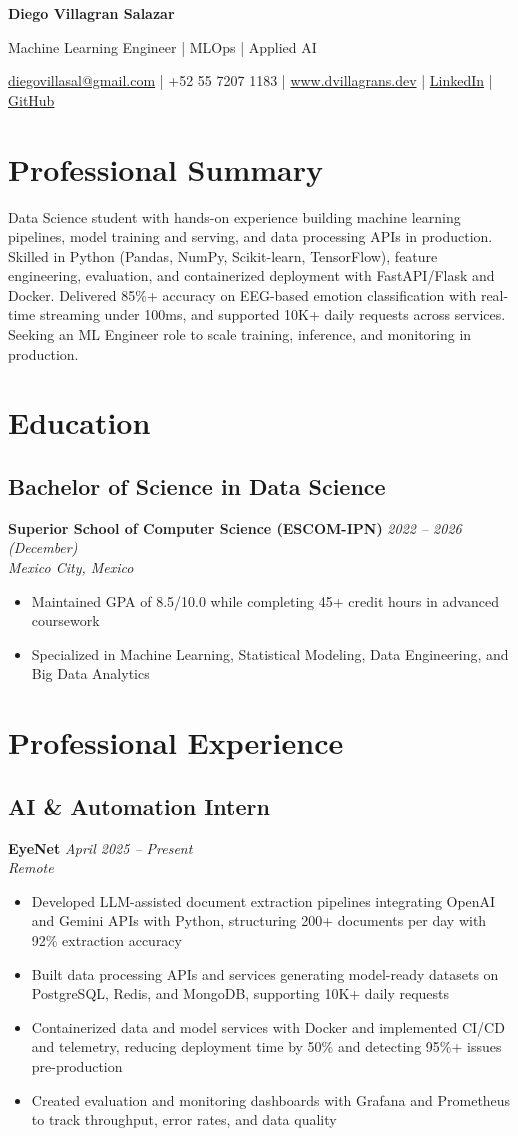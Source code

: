 \documentclass[7.5pt,a4paper]{article}
\newcommand{\name}[1]{\begin{center}\Large\bfseries\color{HarvardCrimson}#1\end{center}}
\newcommand{\tagline}[1]{\begin{center}\normalsize\color{DarkGray}#1\end{center}}
\newcommand{\contactinfo}[1]{\begin{center}\small\color{MediumGray}#1\end{center}}
\newcommand{\experience}[4]{\subsection*{#1}\textbf{#2} \hfill \textit{#3} \\\textit{#4}}
\newcommand{\education}[4]{\subsection*{#1}\textbf{#2} \hfill \textit{#3} \\\textit{#4}}
\begin{document}
\name{Diego Villagran Salazar}
\tagline{Machine Learning Engineer | MLOps | Applied AI}
\contactinfo{\href{mailto:diegovillasal@gmail.com}{diegovillasal@gmail.com} | +52 55 7207 1183 | \href{https://www.dvillagrans.dev}{www.dvillagrans.dev} | \href{https://www.linkedin.com/in/dvillagrans}{LinkedIn} | \href{https://github.com/dvillagrans}{GitHub}}

\vspace{0.01cm}

\section*{Professional Summary}
\small
Data Science student with hands-on experience building machine learning pipelines, model training and serving, and data processing APIs in production. Skilled in Python (Pandas, NumPy, Scikit-learn, TensorFlow), feature engineering, evaluation, and containerized deployment with FastAPI/Flask and Docker. Delivered 85\%+ accuracy on EEG-based emotion classification with real-time streaming under 100ms, and supported 10K+ daily requests across services. Seeking an ML Engineer role to scale training, inference, and monitoring in production.

\vspace{0.01cm}

\section*{Education}
\education{Bachelor of Science in Data Science}{Superior School of Computer Science (ESCOM-IPN)}{2022 -- 2026 (December)}{Mexico City, Mexico}
\begin{itemize}
\item Maintained GPA of 8.5/10.0 while completing 45+ credit hours in advanced coursework
\item Specialized in Machine Learning, Statistical Modeling, Data Engineering, and Big Data Analytics
\end{itemize}

\section*{Professional Experience}

\experience{AI \& Automation Intern}{EyeNet}{April 2025 -- Present}{Remote}
\begin{itemize}
\item Developed LLM-assisted document extraction pipelines integrating OpenAI and Gemini APIs with Python, structuring 200+ documents per day with 92\% extraction accuracy
\item Built data processing APIs and services generating model-ready datasets on PostgreSQL, Redis, and MongoDB, supporting 10K+ daily requests
\item Containerized data and model services with Docker and implemented CI/CD and telemetry, reducing deployment time by 50\% and detecting 95\%+ issues pre-production
\item Created evaluation and monitoring dashboards with Grafana and Prometheus to track throughput, error rates, and data quality
\end{itemize}
\end{document}

